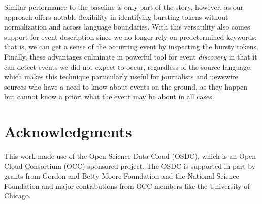 \documentclass{acm_proc_article-sp}
\begin{document}
Similar performance to the baseline is only part of the story, however, as our approach offers notable flexibility in identifying bursting tokens without normalization and across language boundaries.
With this versatility also comes support for event description since we no longer rely on predetermined keywords; that is, we can get a sense of the occurring event by inspecting the bursty tokens.
Finally, these advantages culminate in powerful tool for event \emph{discovery} in that it can detect events we did not expect to occur, regardless of the source language, which makes this technique particularly useful for journalists and newswire sources who have a need to know about events on the ground, as they happen but cannot know a priori what the event may be about in all cases.


\section{Acknowledgments}
This work made use of the Open Science Data Cloud (OSDC), which is an Open Cloud Consortium (OCC)-sponsored project. 
The OSDC is supported in part by grants from Gordon and Betty Moore Foundation and the National Science Foundation and major contributions from OCC members like the University of Chicago. 

%

%
%
\end{document}
